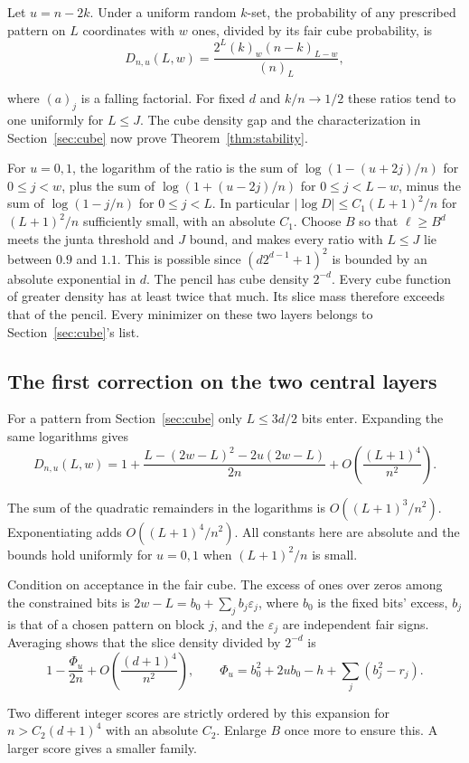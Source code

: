 \documentclass[11pt,letterpaper]{article}
\numberwithin{equation}{section}
\begin{document}
Let $u=n-2k$. Under a uniform random $k$-set, the probability of any prescribed pattern on $L$
coordinates with $w$ ones, divided by its fair cube probability, is
\[
D_{n,u}(L,w)=\frac{2^L(k)_w(n-k)_{L-w}}{(n)_L},
\]

where $(a)_j$ is a falling factorial. For fixed $d$ and $k/n\to1/2$ these ratios tend to one
uniformly for $L\le J$. The cube density gap and the characterization in
Section~\ref{sec:cube} now prove Theorem~\ref{thm:stability}.

For $u=0,1$, the logarithm of the ratio is the sum of $\log(1-(u+2j)/n)$ for $0\le j<w$, plus
the sum of $\log(1+(u-2j)/n)$ for $0\le j<L-w$, minus the sum of $\log(1-j/n)$ for $0\le j<L$.
In particular $|\log D|\le C_1(L+1)^2/n$ for $(L+1)^2/n$ sufficiently small, with an absolute
$C_1$. Choose $B$ so that $\ell\ge B^d$ meets the junta threshold and $J$ bound, and makes
every ratio with $L\le J$ lie between $0.9$ and $1.1$. This is possible since $(d2^{d-1}+1)^2$
is bounded by an absolute exponential in $d$. The pencil has cube density $2^{-d}$. Every cube
function of greater density has at least twice that much. Its slice mass therefore exceeds
that of the pencil. Every minimizer on these two layers belongs to Section~\ref{sec:cube}'s
list.

\subsection{The first correction on the two central layers}\label{sec:central}

For a pattern from Section~\ref{sec:cube} only $L\le3d/2$ bits enter. Expanding the same logarithms gives
\[
D_{n,u}(L,w)=1+\frac{L-(2w-L)^2-2u(2w-L)}{2n}
+O\!\left(\frac{(L+1)^4}{n^2}\right).
\]

The sum of the quadratic remainders in the logarithms is $O((L+1)^3/n^2)$. Exponentiating adds
$O((L+1)^4/n^2)$. All constants here are absolute and the bounds hold uniformly for $u=0,1$
when $(L+1)^2/n$ is small.

Condition on acceptance in the fair cube. The excess of ones over zeros among the constrained
bits is $2w-L=b_0+\sum_j b_j\varepsilon_j$, where $b_0$ is the fixed bits' excess, $b_j$ is
that of a chosen pattern on block $j$, and the $\varepsilon_j$ are independent fair signs.
Averaging shows that the slice density divided by $2^{-d}$ is
\[
1-\frac{\Phi_u}{2n}+O\!\left(\frac{(d+1)^4}{n^2}\right),
\qquad
\Phi_u=b_0^2+2u b_0-h+\sum_j(b_j^2-r_j).
\]

Two different integer scores are strictly ordered by this expansion for $n>C_2(d+1)^4$ with an
absolute $C_2$. Enlarge $B$ once more to ensure this. A larger score gives a smaller family.
\end{document}
